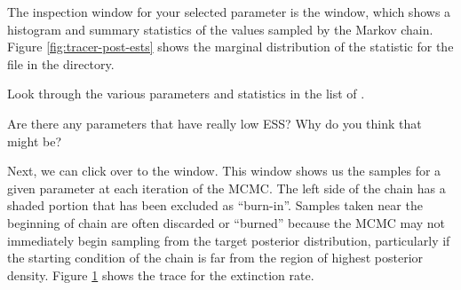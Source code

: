 The inspection window for your selected parameter is the  window, which shows a histogram and summary statistics of the values sampled by the Markov chain. 
Figure \ref{fig:tracer-post-ests} shows the marginal distribution of the  statistic for the  file in the  directory.


\begin{framed}
Look through the various parameters and statistics in the list of . 

\QUEST Are there any parameters that have really low ESS? Why do you think that might be?
\end{framed}

Next, we can click over to the  window.
This window shows us the samples for a given parameter at each iteration of the MCMC.
The left side of the chain has a shaded portion that has been excluded as ``burn-in''.
Samples taken near the beginning of chain are often discarded or ``burned'' because the MCMC may not immediately begin sampling from the target posterior distribution, particularly if the starting condition of the chain is far from the region of highest posterior density.
Figure \ref{fig:tracer-extinction-trace} shows the trace for the extinction rate.

\begin{figure}[h!]
\label{fig:tracer-extinction-trace}
\end{figure}

